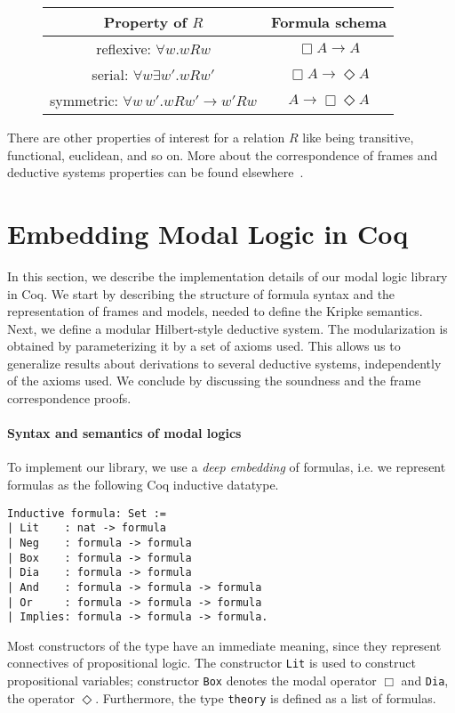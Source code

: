 \documentclass[sigconf]{acmart}
\begin{document}
\begin{figure}[H]
\begin{tabular}{|c|c|}
  \hline
  Property of $R$                          & Formula schema \\ \hline
  reflexive: $\forall w.wRw$               & $\Box A \to A$ \\ 
  serial: $\forall w\exists w'. wRw'$      & $\Box A \to \Diamond A$ \\
  symmetric: $\forall w\,w'.wRw' \to w'Rw$ & $A \to \Box\Diamond A$ \\
  \hline
\end{tabular}
\end{figure}
There are other properties of interest for a relation $R$ like being
transitive, functional, euclidean, and so on. More about the correspondence
of frames and deductive systems properties can be found elsewhere~\cite{Chellas,blackburn}.

\section{Embedding Modal Logic in Coq}\label{sec:implementation}

In this section, we describe the implementation details of our modal logic
library in Coq. We start by describing the structure of formula syntax and the
representation of frames and models, needed to define the Kripke semantics.
Next, we define a modular Hilbert-style deductive system. The modularization is
obtained by parameterizing it by a set of axioms used. This allows us to
generalize results about derivations to several deductive systems, independently
of the axioms used. We conclude by discussing the soundness and the frame
correspondence proofs.

\paragraph{Syntax and semantics of modal logics}
To implement our library, we use a \emph{deep embedding} of
formulas, i.e. we represent formulas as the following Coq inductive datatype.
\begin{verbatim}
Inductive formula: Set :=
| Lit    : nat -> formula
| Neg    : formula -> formula
| Box    : formula -> formula
| Dia    : formula -> formula
| And    : formula -> formula -> formula
| Or     : formula -> formula -> formula
| Implies: formula -> formula -> formula.
\end{verbatim}
Most constructors of the type have an immediate meaning, since they represent
connectives of propositional logic. The constructor \texttt{Lit}
is used to construct propositional variables; constructor \texttt{Box}
denotes the modal operator $\Box$ and \texttt{Dia}, the operator
$\Diamond$. Furthermore, the type \texttt{theory} is defined as a list
of formulas.
\end{document}
